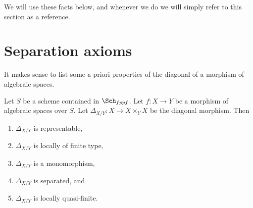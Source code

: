 \medskip\noindent
We will use these facts below, and whenever we do we will simply refer
to this section as a reference.















\section{Separation axioms}
\label{section-separation-axioms}

\noindent
It makes sense to list some a priori properties of the diagonal of
a morphism of algebraic spaces.

\begin{lemma}
\label{lemma-properties-diagonal}
Let $S$ be a scheme contained in $\Sch_{fppf}$.
Let $f : X \to Y$ be a morphism of algebraic spaces over $S$.
Let $\Delta_{X/Y} : X \to X \times_Y X$ be the diagonal morphism.
Then
\begin{enumerate}
\item $\Delta_{X/Y}$ is representable,
\item $\Delta_{X/Y}$ is locally of finite type,
\item $\Delta_{X/Y}$ is a monomorphism,
\item $\Delta_{X/Y}$ is separated, and
\item $\Delta_{X/Y}$ is locally quasi-finite.
\end{enumerate}
\end{lemma}

